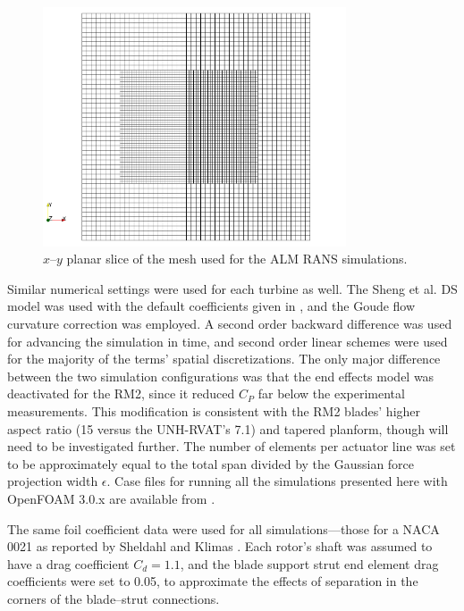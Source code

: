 \documentclass[times]{weauth}
\begin{document}
\begin{figure}
    \centering

    \includegraphics[width=0.8\textwidth]{thesis_alm-mesh}

    \caption{$x$--$y$ planar slice of the mesh used for the ALM RANS
        simulations.}

    \label{fig:ALM-mesh}
\end{figure}

Similar numerical settings were used for each turbine as well. The Sheng et al.
DS model was used with the default coefficients given in \cite{Sheng2008}, and
the Goude flow curvature correction was employed. A second order backward
difference was used for advancing the simulation in time, and second order
linear schemes were used for the majority of the terms' spatial discretizations.
The only major difference between the two simulation configurations was that the
end effects model was deactivated for the RM2, since it reduced $C_P$ far below
the experimental measurements. This modification is consistent with the RM2
blades' higher aspect ratio (15 versus the UNH-RVAT's 7.1) and tapered planform,
though will need to be investigated further. The number of elements per actuator
line was set to be approximately equal to the total span divided by the Gaussian
force projection width $\epsilon$. Case files for running all the simulations
presented here with OpenFOAM 3.0.x are available from
\cite{Bachant2016-UNH-RVAT-turbinesFoam-v1.0.0,
Bachant2016-RM2-turbinesFoam-v1.0.0,
Bachant2016-UNH-RVAT-turbinesFoam-v1.0.0-LES}.

The same foil coefficient data were used for all simulations---those for a NACA
0021 as reported by Sheldahl and Klimas \cite{Sheldahl1981}. Each rotor's shaft
was assumed to have a drag coefficient $C_d = 1.1$, and the blade support strut
end element drag coefficients were set to 0.05, to approximate the effects of
separation in the corners of the blade--strut connections.
\end{document}
